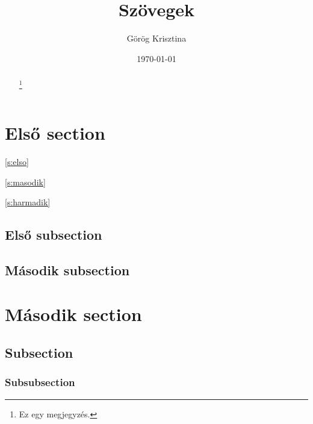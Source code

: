 \documentclass[12pt, twoside]{article}
\title{Szövegek}
\author{Görög Krisztina}
\date{\today}
\begin{document}
\pagestyle{fancy}
\setlength{\headheight}{52pt}

\renewcommand{\footrulewidth}{0.4pt}
\fancyhead[LE,RO]{\thepage}
\fancyhead[LO]{\leftmark}
\fancyhead[RE]{\rightmark}

\renewcommand{\thefootnote}{\fnsymbol{footnote}}
\maketitle

\begin{abstract}
\hulipsum[1]\footnote{Ez egy megjegyzés.}
\end{abstract}

\setcounter{tocdepth}{5}
\tableofcontents
\clearpage

\setcounter{secnumdepth}{5}

\section{Első section}

\autoref{s:elso}

\ref{s:masodik}

\ref{s:harmadik}


\pageref{s:masodik}

\pageref{s:harmadik}

\subsection{Első subsection}
\hulipsum
{}\label{s:elso}
\hulipsum[1]

\subsection{Második subsection}
\hulipsum

\section[Második]{Második section}
\subsection{Subsection}
\subsubsection{Subsubsection}
\end{document}
